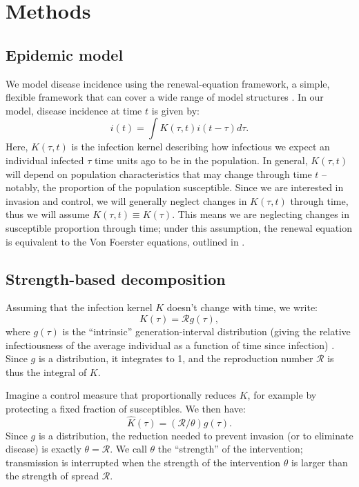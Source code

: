 \documentclass[12pt]{article}\usepackage[]{graphicx}\usepackage[]{color}
\newcommand{\RR}{\ensuremath{{\mathcal R}}}
\newcommand{\eqlab}[1]{\label{eq:#1}}
\begin{document}
\section{Methods}

\subsection{Epidemic model}

We model disease incidence using the renewal-equation framework, a simple, flexible framework that can cover a wide range of model structures \citep{Champredon2018equivalence}.
In our model, disease incidence at time $t$ is given by:
\begin{equation}
i(t) = \int K(\tau, t) i(t-\tau) d\tau.
\end{equation}
Here, $K(\tau, t)$ is the infection kernel describing how infectious we expect an individual infected $\tau$ time units ago to be in the population.
In general, $K(\tau, t)$ will depend on population characteristics that may change through time $t$ -- notably, the proportion of the population susceptible.
Since we are interested in invasion and control, we will generally neglect changes in $K(\tau, t)$ through time, thus we will assume $K(\tau, t) \equiv K(\tau)$. 
This means we are neglecting changes in susceptible proportion through time;
under this assumption, the renewal equation is equivalent to the Von Foerster equations, outlined in \cite{fraser2004factors}.

\subsection{Strength-based decomposition}

Assuming that the infection kernel $K$ doesn't change with time, we write:
\begin{equation}
	K(\tau) = \RR g(\tau),
	\eqlab{strength}
\end{equation}
where $g(\tau)$ is the ``intrinsic'' generation-interval distribution (giving the relative infectiousness of the average individual as a function of time since infection) \citep{champredon2015intrinsic}. 
Since $g$ is a distribution, it integrates to 1, and the reproduction number $\RR$ is thus the integral of $K$.

Imagine a control measure that proportionally reduces $K$, for example by protecting a fixed fraction of susceptibles. We then have:
\begin{equation}
	\hat K(\tau) = (\RR/\theta) g(\tau).
\end{equation}
Since $g$ is a distribution, the reduction needed to prevent invasion (or to eliminate disease)  is exactly $\theta=\RR$. We call $\theta$ the ``strength'' of the intervention; transmission is interrupted when the strength of the intervention $\theta$ is larger than the strength of spread \RR.
\end{document}

